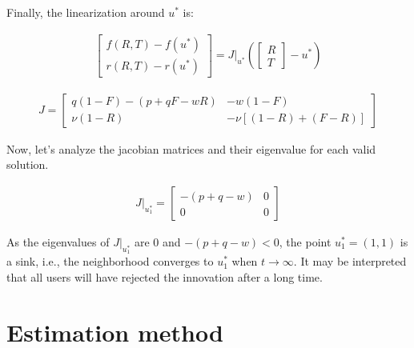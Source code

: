 Finally, the linearization around $u^*$ is:

\begin{align}
\begin{bmatrix}
	f(R, T) - f(u^*) \\
	r(R, T) - r(u^*)
\end{bmatrix} = J|_{u^*} \left( \begin{bmatrix} R \\ T \end{bmatrix}-u^* \right)
\end{align}

\begin{align}
J =
\begin{bmatrix}
	q(1-F)-(p+qF-wR) & -w(1-F) \\
	\nu (1-R) & -\nu [(1-R) + (F-R)]
\end{bmatrix}
\end{align}

Now, let's analyze the jacobian matrices and their eigenvalue for each valid solution.

\begin{align}
J|_{u_1^*} =
\begin{bmatrix}
	-(p+q-w) & 0 \\
	0 & 0
\end{bmatrix}
\end{align}

As the eigenvalues of $J|_{u_1^*}$ are $0$ and $-(p+q-w) < 0$, the point $u_1^* = (1, 1)$ is a sink, i.e., the neighborhood converges to $u_1^*$ when $t \rightarrow \infty$. It may be interpreted that all users will have rejected the innovation after a long time.





\chapter{Estimation method}

